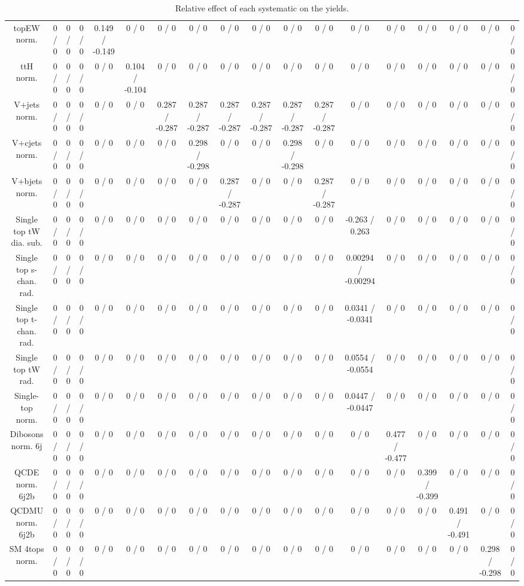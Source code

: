 \documentclass[10pt]{article}
\begin{document}
\begin{table}[htbp]
\begin{center}
\begin{tabular}{|c|c|c|c|c|c|c|c|c|c|c|c|c|c|c|c|c|c|}
  topEW norm. & 0 / 0 & 0 / 0 & 0 / 0 & 0.149 / -0.149 & 0 / 0 & 0 / 0 & 0 / 0 & 0 / 0 & 0 / 0 & 0 / 0 & 0 / 0 & 0 / 0 & 0 / 0 & 0 / 0 & 0 / 0 & 0 / 0 & 0 / 0 \\ 
  ttH norm. & 0 / 0 & 0 / 0 & 0 / 0 & 0 / 0 & 0.104 / -0.104 & 0 / 0 & 0 / 0 & 0 / 0 & 0 / 0 & 0 / 0 & 0 / 0 & 0 / 0 & 0 / 0 & 0 / 0 & 0 / 0 & 0 / 0 & 0 / 0 \\ 
  V+jets norm. & 0 / 0 & 0 / 0 & 0 / 0 & 0 / 0 & 0 / 0 & 0.287 / -0.287 & 0.287 / -0.287 & 0.287 / -0.287 & 0.287 / -0.287 & 0.287 / -0.287 & 0.287 / -0.287 & 0 / 0 & 0 / 0 & 0 / 0 & 0 / 0 & 0 / 0 & 0 / 0 \\ 
  V+cjets norm. & 0 / 0 & 0 / 0 & 0 / 0 & 0 / 0 & 0 / 0 & 0 / 0 & 0.298 / -0.298 & 0 / 0 & 0 / 0 & 0.298 / -0.298 & 0 / 0 & 0 / 0 & 0 / 0 & 0 / 0 & 0 / 0 & 0 / 0 & 0 / 0 \\ 
  V+bjets norm. & 0 / 0 & 0 / 0 & 0 / 0 & 0 / 0 & 0 / 0 & 0 / 0 & 0 / 0 & 0.287 / -0.287 & 0 / 0 & 0 / 0 & 0.287 / -0.287 & 0 / 0 & 0 / 0 & 0 / 0 & 0 / 0 & 0 / 0 & 0 / 0 \\ 
  Single top tW dia. sub. & 0 / 0 & 0 / 0 & 0 / 0 & 0 / 0 & 0 / 0 & 0 / 0 & 0 / 0 & 0 / 0 & 0 / 0 & 0 / 0 & 0 / 0 & -0.263 / 0.263 & 0 / 0 & 0 / 0 & 0 / 0 & 0 / 0 & 0 / 0 \\ 
  Single top s-chan. rad. & 0 / 0 & 0 / 0 & 0 / 0 & 0 / 0 & 0 / 0 & 0 / 0 & 0 / 0 & 0 / 0 & 0 / 0 & 0 / 0 & 0 / 0 & 0.00294 / -0.00294 & 0 / 0 & 0 / 0 & 0 / 0 & 0 / 0 & 0 / 0 \\ 
  Single top t-chan. rad. & 0 / 0 & 0 / 0 & 0 / 0 & 0 / 0 & 0 / 0 & 0 / 0 & 0 / 0 & 0 / 0 & 0 / 0 & 0 / 0 & 0 / 0 & 0.0341 / -0.0341 & 0 / 0 & 0 / 0 & 0 / 0 & 0 / 0 & 0 / 0 \\ 
  Single top tW rad. & 0 / 0 & 0 / 0 & 0 / 0 & 0 / 0 & 0 / 0 & 0 / 0 & 0 / 0 & 0 / 0 & 0 / 0 & 0 / 0 & 0 / 0 & 0.0554 / -0.0554 & 0 / 0 & 0 / 0 & 0 / 0 & 0 / 0 & 0 / 0 \\ 
  Single-top norm. & 0 / 0 & 0 / 0 & 0 / 0 & 0 / 0 & 0 / 0 & 0 / 0 & 0 / 0 & 0 / 0 & 0 / 0 & 0 / 0 & 0 / 0 & 0.0447 / -0.0447 & 0 / 0 & 0 / 0 & 0 / 0 & 0 / 0 & 0 / 0 \\ 
  Dibosons norm. 6j & 0 / 0 & 0 / 0 & 0 / 0 & 0 / 0 & 0 / 0 & 0 / 0 & 0 / 0 & 0 / 0 & 0 / 0 & 0 / 0 & 0 / 0 & 0 / 0 & 0.477 / -0.477 & 0 / 0 & 0 / 0 & 0 / 0 & 0 / 0 \\ 
  QCDE norm. 6j2b & 0 / 0 & 0 / 0 & 0 / 0 & 0 / 0 & 0 / 0 & 0 / 0 & 0 / 0 & 0 / 0 & 0 / 0 & 0 / 0 & 0 / 0 & 0 / 0 & 0 / 0 & 0.399 / -0.399 & 0 / 0 & 0 / 0 & 0 / 0 \\ 
  QCDMU norm. 6j2b & 0 / 0 & 0 / 0 & 0 / 0 & 0 / 0 & 0 / 0 & 0 / 0 & 0 / 0 & 0 / 0 & 0 / 0 & 0 / 0 & 0 / 0 & 0 / 0 & 0 / 0 & 0 / 0 & 0.491 / -0.491 & 0 / 0 & 0 / 0 \\ 
  SM 4tops norm. & 0 / 0 & 0 / 0 & 0 / 0 & 0 / 0 & 0 / 0 & 0 / 0 & 0 / 0 & 0 / 0 & 0 / 0 & 0 / 0 & 0 / 0 & 0 / 0 & 0 / 0 & 0 / 0 & 0 / 0 & 0.298 / -0.298 & 0 / 0 \\ 
\hline 
\end{tabular} 
\caption{Relative effect of each systematic on the yields.} 
\end{center} 
\end{table} 
\end{document}
